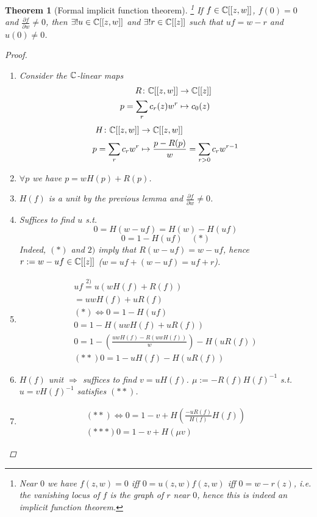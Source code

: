 \documentclass[A4paper, british, reqno]{amsart}
\theoremstyle{darkgreentheorem}
\newtheorem{thm}{Theorem}[section]
\theoremstyle{darkbluedefinition}
\theoremstyle{darkredexample}
\theoremstyle{remark}
\newcommand{\1}{\mathbbm{1}}
\begin{document}
\begin{thm}[Formal implicit function theorem]\footnote{Near $0$ we have $f(z,w)=0$ iff $0=u(z,w)f(z,w)$ iff $0=w-r(z)$, i.e. the vanishing locus of $f$ is the graph of $r$ near $0$, hence this is indeed an implicit function theorem.}
    If $f\in \mathbb{C}[[z,w]]$, $f(0)=0$ and $\frac{\partial f}{\partial w}\neq 0$, then $\exists ! u\in \mathbb{C}[[z,w]]$ and $\exists ! r\in \mathbb{C}[[z]]$ such that $uf=w-r$ and $u(0)\neq 0$.
    \begin{proof}
	\begin{enumerate}[label=\arabic*)]
	    \item Consider the $\mathbb{C}$-linear maps
		\begin{align*}
		    R\colon \mathbb{C}[[z,w]] & \to \mathbb{C}[[z]] \\
		    p=\sum_{r}c_{r}(z)w^{r} & \mapsto c_{0}(z)
		\end{align*}
		\begin{align*}
		    H\colon \mathbb{C}[[z,w]] &\to \mathbb{C}[[z,w]] \\
		    p=\sum_{r}c_{r}w^{r} & \mapsto \frac{p-R(p)}{w}=\sum_{r>0}c_{r}w^{r-1}
		\end{align*}
	    \item $\forall p$ we have $p=wH(p)+R(p)$.
	    \item $H(f)$ is a unit by the previous lemma and $\frac{\partial f}{\partial w}\neq 0$.
	    \item Suffices to find $u$ s.t.
		\[ 0=H(w-uf)=H(w)-H(uf)\]
		\[ 0=1-H(uf) \quad (*) \]
		Indeed, $(*)$ and $2)$ imply that $R(w-uf)=w-uf$, hence $r:=w-uf\in \mathbb{C}[[z]]$ ($w=uf+(w-uf)=uf+r$).
	    \item \begin{multline*}
		    uf\overset{2)}{=} u(wH(f)+R(f))\\
		    =uwH(f)+uR(f)\\
		    (*)\Leftrightarrow 0=1-H(uf)\\
		    0=1-H(uwH(f)+uR(f)) \\
		    0=1-(\frac{uwH(f)-R(uwH(f))}{w})-H(uR(f)) \\
		    (**) 0=1-uH(f)-H(uR(f))
	    \end{multline*}
	\item $H(f)$ unit $\Rightarrow $ suffices to find $v=uH(f)$.
	    $\mu:=-R(f)H(f)^{-1}$ s.t. $u=vH(f)^{-1}$ satisfies $(**)$.
	\item \begin{multline*}
		(**)\Leftrightarrow 0=1-v+H(\frac{-uR(f)}{H(f)}H(f)) \\
		(***) 0=1-v+H(\mu v)

\end{multline*}
\end{enumerate}
\end{proof}
\end{thm}
\end{document}
